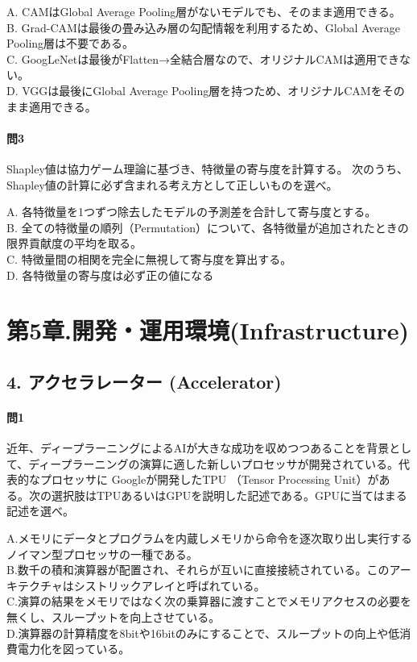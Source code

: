 \documentclass[
  letterpaper,
  DIV=11,
  numbers=noendperiod]{scrreprt}
\begin{document}
A. CAMはGlobal Average Pooling層がないモデルでも、そのまま適用できる。\\
B. Grad-CAMは最後の畳み込み層の勾配情報を利用するため、Global Average
Pooling層は不要である。\\
C.
GoogLeNetは最後がFlatten→全結合層なので、オリジナルCAMは適用できない。\\
D. VGGは最後にGlobal Average
Pooling層を持つため、オリジナルCAMをそのまま適用できる。

\subsection{問3}\label{ux554f3-1}

Shapley値は協力ゲーム理論に基づき、特徴量の寄与度を計算する。
次のうち、Shapley値の計算に必ず含まれる考え方として正しいものを選べ。

A. 各特徴量を1つずつ除去したモデルの予測差を合計して寄与度とする。\\
B.
全ての特徴量の順列（Permutation）について、各特徴量が追加されたときの限界貢献度の平均を取る。\\
C. 特徴量間の相関を完全に無視して寄与度を算出する。\\
D. 各特徴量の寄与度は必ず正の値になる

\part{第5章.開発・運用環境(Infrastructure)}

\chapter{4. アクセラレーター
(Accelerator)}\label{ux30a2ux30afux30bbux30e9ux30ecux30fcux30bfux30fc-accelerator}

\subsection{問1}\label{ux554f1-11}

近年、ディープラーニングによるAIが大きな成功を収めつつあることを背景として、ディープラーニングの演算に適した新しいプロセッサが開発されている。代表的なプロセッサに
Googleが開発したTPU （Tensor Processing
Unit）がある。次の選択肢はTPUあるいはGPUを説明した記述である。GPUに当てはまる記述を選べ。

A.メモリにデータとプログラムを内蔵しメモリから命令を逐次取り出し実行するノイマン型プロセッサの一種である。\\
B.数千の積和演算器が配置され、それらが互いに直接接続されている。このアーキテクチャはシストリックアレイと呼ばれている。\\
C.演算の結果をメモリではなく次の乗算器に渡すことでメモリアクセスの必要を無くし、スループットを向上させている。\\
D.演算器の計算精度を8bitや16bitのみにすることで、スループットの向上や低消費電力化を図っている。
\end{document}
